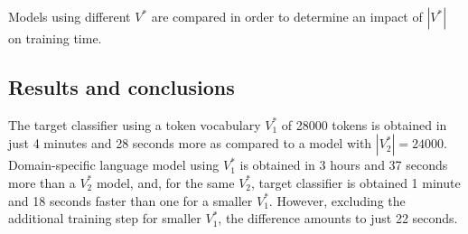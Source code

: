 Models using different $V^*$ are compared in order to determine an impact of $|V^*|$ on training time.

\subsection{Results and conclusions}

The target classifier using a token vocabulary $V^*_1$ of 28000 tokens is obtained in just 4 minutes and 28 seconds more as compared to a model with $|V^*_2| = 24000$. Domain-specific language model using $V^*_1$ is obtained in 3 hours and 37 seconds more than a $V^*_2$ model, and, for the same $V^*_2$, target classifier is obtained 1 minute and 18 seconds faster than one for a smaller $V^*_1$. However, excluding the additional training step for smaller $V^*_1$, the difference amounts to just 22 seconds.

